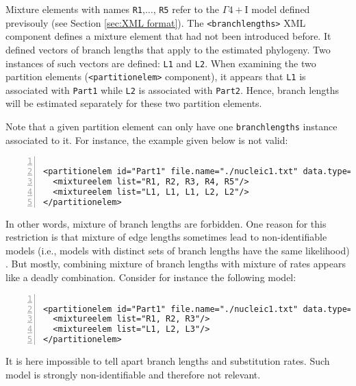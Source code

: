 \documentclass[a4paper,12pt]{article}
\newcommand{\x}[1]{\texttt{#1}}
\begin{document}
Mixture elements with names  \x{R1},$\ldots$, \x{R5} refer to the $\Gamma4+$I model defined
previsouly  (see Section  \ref{sec:XML format}).   The \x{<branchlengths>}  XML component  defines a
mixture element  that had not  been introduced  before.  It defined  vectors of branch  lengths that
apply to the estimated phylogeny. Two instances of  such vectors are defined: \x{L1} and \x{L2}.
When examining the  two partition elements (\x{<partitionelem>} component), it  appears that \x{L1}
is associated with \x{Part1} while \x{L2} is associated with \x{Part2}.  Hence, branch lengths
will be estimated separately for these two partition elements.  

Note that  a given partition element  can only have  one {\tt branchlengths} instance  associated to
it. For instance, the example given below is not valid:

\vspace{0.2cm}
\begin{Verbatim}[frame=single, label=Invalid mixture, samepage=true, baselinestretch=0.5,
  fontsize=\small, numbers=left]

<partitionelem id="Part1" file.name="./nucleic1.txt" data.type="nt">
  <mixtureelem list="R1, R2, R3, R4, R5"/>
  <mixtureelem list="L1, L1, L1, L2, L2"/>
</partitionelem>

\end{Verbatim}

In other words, mixture of branch lengths are forbidden. One reason for this restriction is that
mixture of edge lengths sometimes lead to non-identifiable models (i.e., models with distinct sets
of branch lengths have the same likelihood) \cite{matsen07}. But mostly, combining mixture of branch
lengths with mixture of rates appears like a deadly combination. Consider for instance the following model:

\vspace{0.2cm}
\begin{Verbatim}[frame=single, label=Invalid mixture, samepage=true, baselinestretch=0.5,
  fontsize=\small, numbers=left]

<partitionelem id="Part1" file.name="./nucleic1.txt" data.type="nt">
  <mixtureelem list="R1, R2, R3"/>
  <mixtureelem list="L1, L2, L3"/>
</partitionelem>

\end{Verbatim}

It is here impossible to tell apart  branch lengths and substitution rates. Such model is strongly
non-identifiable and therefore not relevant.
\end{document}
